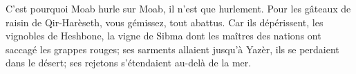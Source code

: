 C’est pourquoi Moab hurle sur Moab, il n’est que hurlement.
Pour les gâteaux de raisin de Qir-Harèseth,
	vous gémissez, tout abattus.
Car ils dépérissent, les vignobles de Heshbone,
	la vigne de Sibma dont les maîtres des nations ont saccagé les grappes rouges;
	ses sarments allaient jusqu’à Yazèr, ils se perdaient dans le désert;
	ses rejetons s’étendaient au-delà de la mer.
